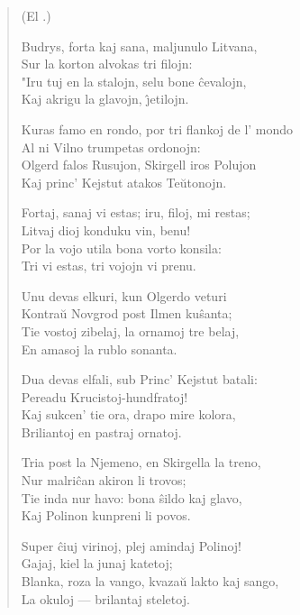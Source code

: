 \begin{verse}
\begin{center}
\footnotesize (El .)
\end{center}

               Budrys, forta kaj sana, maljunulo Litvana,\\
               \vin  Sur la korton alvokas tri filojn:\\
                 "Iru tuj en la stalojn, selu bone \^cevalojn,\\
               \vin  Kaj akrigu la glavojn, \^{\j}etilojn.

               Kuras famo en rondo, por tri flankoj de l' mondo\\
               \vin  Al ni Vilno trumpetas ordonojn:\\
               Olgerd falos Rusujon, Skirgell iros Polujon\\
               \vin  Kaj princ' Kejstut atakos Te\u utonojn.

               Fortaj, sanaj vi estas; iru, filoj, mi restas;\\
               \vin  Litvaj dioj konduku vin, benu!\\
               Por la vojo utila bona vorto konsila:\\
               \vin  Tri vi estas, tri vojojn vi prenu.

               Unu devas elkuri, kun Olgerdo veturi\\
               \vin  Kontra\u u Novgrod post Ilmen ku\^santa;\\
               Tie vostoj zibelaj, la ornamoj tre belaj,\\
               \vin  En amasoj la rublo sonanta.

               Dua devas elfali, sub Princ' Kejstut batali:\\
               \vin  Pereadu Krucistoj-hundfratoj!\\
               Kaj sukcen' tie ora, drapo mire kolora,\\
               \vin  Briliantoj en pastraj ornatoj.

               Tria post la Njemeno, en Skirgella la treno,\\
               \vin  Nur malri\^can akiron li trovos;\\
               Tie inda nur havo: bona \^sildo kaj glavo,\\
               \vin  Kaj Polinon kunpreni li povos.

               Super \^ciuj virinoj, plej amindaj Polinoj!\\
               \vin  Gajaj, kiel la junaj katetoj;\\
               Blanka, roza la vango, kvaza\u u lakto kaj sango,\\
               \vin  La okuloj --- brilantaj steletoj.


\end{verse}
